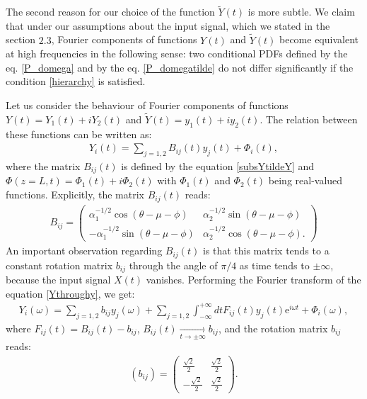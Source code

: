 \documentclass{article}
\begin{document}
The second reason for our choice of the function $\tilde{Y}(t)$ is more subtle. We claim that under our assumptions about the input signal, which we stated in the section $2.3$, Fourier components of functions $Y(t)$ and $\tilde{Y}(t)$ become equivalent at high frequencies in the following sense: two conditional PDFs defined by the eq. \eqref{P_domega} and by the eq. \eqref{P_domegatilde} do not differ significantly if the condition \eqref{hierarchy} is satisfied. 

Let us consider the behaviour of Fourier components of functions $Y(t)=Y_{1}(t)+iY_{2}(t)$ and $\tilde{Y}(t)=y_{1}(t)+iy_{2}(t)$. The relation between these functions can be written as:
\begin{eqnarray}\label{Ythroughy}
    Y_{i}(t) = \sum_{j=1,2}B_{ij}(t)y_{j}(t) + \Phi_{i}(t),
\end{eqnarray}
where the matrix $B_{ij}(t)$ is defined by the equation \eqref{subsYtildeY} and $\Phi(z=L,t)=\Phi_{1}(t)+i\Phi_{2}(t)$ with $\Phi_{1}(t)$ and $\Phi_{2}(t)$ being real-valued functions. Explicitly, the matrix $B_{ij}(t)$ reads:
\begin{eqnarray}
    B_{ij} = 
    \begin{pmatrix}
        \alpha_{1}^{-1/2}\cos \left(\theta - \mu - \phi\right) & \alpha_{2}^{-1/2}\sin \left(\theta - \mu - \phi\right)\\
        -\alpha_{1}^{-1/2}\sin \left(\theta - \mu - \phi\right) & \alpha_{2}^{-1/2}\cos \left(\theta - \mu - \phi\right).
    \end{pmatrix}
\end{eqnarray}
An important observation regarding $B_{ij}(t)$ is that this matrix tends to a constant rotation matrix $b_{ij}$ through the angle of $\pi/4$ as time tends to $\pm \infty$, because the input signal $X(t)$ vanishes. Performing the Fourier transform of the equation \eqref{Ythroughy}, we get:
\begin{eqnarray}\label{Yomega}
    Y_{i}(\omega) = \sum_{j=1,2}b_{ij}y_{j}(\omega) + \sum_{j=1,2}\int_{-\infty}^{+\infty} dt F_{ij}(t) y_{j}(t)\textrm{e}^{i\omega t} + \Phi_{i}(\omega),
\end{eqnarray}
where $F_{ij}(t) = B_{ij}(t) - b_{ij}$, $B_{ij}(t) \underset{t \to \pm \infty}{\rightarrow}  b_{ij}$, and the rotation matrix $b_{ij}$ reads: 
\begin{eqnarray}
    \left(b_{ij}\right) = 
    \begin{pmatrix}
        \frac{\sqrt{2}}{2} & \frac{\sqrt{2}}{2}\\
        -\frac{\sqrt{2}}{2} & \frac{\sqrt{2}}{2}
    \end{pmatrix}.
\end{eqnarray}
\end{document}

